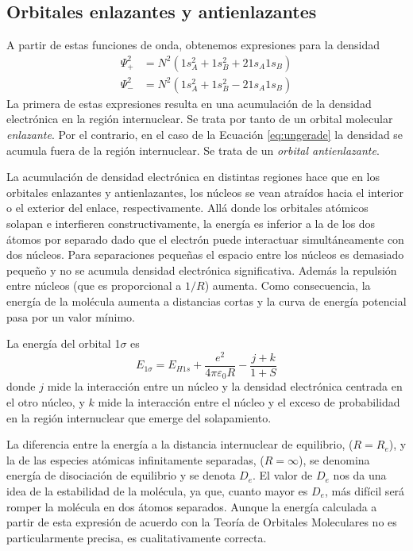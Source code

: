 \documentclass{tufte-handout}
\begin{document}
\subsection{Orbitales enlazantes y antienlazantes}
A partir de estas funciones de onda, obtenemos expresiones 
para la densidad
\begin{align}
    \Psi^2_+ &= N^2(1s^2_A+1s^2_B+21s_A1s_B)\\
    \Psi^2_- &= N^2(1s^2_A+1s^2_B-21s_A1s_B) 
    \label{eq:ungerade}
\end{align}
La primera de estas expresiones resulta en una acumulación
de la densidad electrónica en la región internuclear. Se
trata por tanto de un orbital molecular \textit{enlazante}.
Por el contrario, en el caso de la Ecuación \ref{eq:ungerade} 
la densidad se acumula fuera de la región internuclear. Se
trata de un \textit{orbital antienlazante}. 

La acumulación de densidad electrónica en distintas regiones 
hace que en los orbitales enlazantes y antienlazantes, los 
núcleos se vean atraídos hacia el interior o el exterior del
enlace, respectivamente. Allá donde los orbitales atómicos
solapan e interfieren constructivamente, la energía es inferior
a la de los dos átomos por separado dado que el electrón
puede interactuar simultáneamente con dos núcleos.
Para separaciones pequeñas el
espacio  entre los núcleos es demasiado pequeño y no se 
acumula densidad electrónica significativa. Además la 
repulsión entre núcleos (que es proporcional a $1/R$) aumenta.
Como consecuencia, la energía de la molécula aumenta a 
distancias cortas y la curva de energía potencial pasa por 
un valor mínimo. 

La energía del orbital 1$\sigma$ es 
\begin{equation}
    E_{1\sigma}=E_{H1s} + \frac{e^2}{4\pi\varepsilon_0R}
    -\frac{j+k}{1+S}
\end{equation}
donde $j$ mide
la interacción entre un núcleo y la densidad 
electrónica centrada en el otro núcleo, y $k$
mide la interacción entre el núcleo y el exceso
de probabilidad en la región internuclear
que emerge del solapamiento. 

La diferencia entre la energía a la distancia
internuclear de equilibrio, ($R = R_e$), y la 
de las especies atómicas infinitamente separadas,
($R=\infty$), se denomina energía de disociación
de equilibrio y se denota $D_e$. El valor de $D_e$
nos da una idea de la estabilidad de la molécula, 
ya que, cuanto mayor es $D_e$, más difícil será 
romper la molécula en dos átomos separados. Aunque 
la energía calculada a partir de esta expresión de
acuerdo con la Teoría de Orbitales Moleculares no 
es particularmente precisa, es cualitativamente 
correcta.
\end{document}
